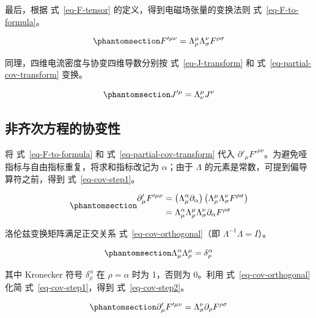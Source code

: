 \documentclass[
  chinese,
  a4paper,
  UTF8,
  12pt,
  oneside,
  openany]{ctexbook}
\theoremstyle{plain}
\theoremstyle{plain}
\theoremstyle{plain}
\theoremstyle{definition}
\theoremstyle{plain}
\theoremstyle{plain}
\theoremstyle{remark}
\begin{document}
最后，根据 式~\ref{eq-F-tensor} 的定义，得到电磁场张量的变换法则
式~\ref{eq-F-to-formula}。

\begin{equation}\protect\phantomsection\label{eq-F-to-formula}{
F'^{\mu\nu} = \Lambda_{\rho}^{\mu}\Lambda_{\sigma}^{\nu}F^{\rho\sigma}
}\end{equation}

同理，四维电流密度与协变四维导数分别按 式~\ref{eq-J-transform} 和
式~\ref{eq-partial-cov-transform} 变换。

\begin{equation}\protect\phantomsection\label{eq-J-transform}{
J'^{\mu} = \Lambda_{\nu}^{\mu}J^{\nu}
}\end{equation}

\subsection{非齐次方程的协变性}\label{ux975eux9f50ux6b21ux65b9ux7a0bux7684ux534fux53d8ux6027}

将 式~\ref{eq-F-to-formula} 和 式~\ref{eq-partial-cov-transform} 代入
\(\partial'_{\mu}F'^{\mu\nu}\)。为避免哑指标与自由指标重复，将求和指标改记为
\(\alpha\)；由于 \(\Lambda\) 的元素是常数，可提到偏导算符之前，得到
式~\ref{eq-cov-step1}。

\begin{equation}\protect\phantomsection\label{eq-cov-step1}{
\begin{aligned}
\partial'_{\mu}F'^{\mu\nu}
&= \left(\Lambda_{\mu}^{\alpha}\partial_{\alpha} \right)
\left(\Lambda_{\rho}^{\mu}\Lambda_{\sigma}^{\nu}F^{\rho\sigma} \right) \\
&= \Lambda_{\mu}^{\alpha}\Lambda_{\rho}^{\mu}\Lambda_{\sigma}^{\nu}\partial_{\alpha}F^{\rho\sigma}
\end{aligned}
}\end{equation}

洛伦兹变换矩阵满足正交关系 式~\ref{eq-cov-orthogonal}（即
\(\Lambda^{-1}\Lambda = I\)）。

\begin{equation}\protect\phantomsection\label{eq-cov-orthogonal}{
\Lambda_{\mu}^{\alpha}\Lambda_{\rho}^{\mu} = \delta_{\rho}^{\alpha}
}\end{equation}

其中 Kronecker 符号 \(\delta_{\rho}^{\alpha}\) 在 \(\rho = \alpha\) 时为
1，否则为 0。利用 式~\ref{eq-cov-orthogonal} 化简
式~\ref{eq-cov-step1}，得到 式~\ref{eq-cov-step2}。

\begin{equation}\protect\phantomsection\label{eq-cov-step2}{
\partial'_{\mu}F'^{\mu\nu} = \Lambda_{\sigma}^{\nu}\partial_{\rho}F^{\rho\sigma}
}\end{equation}
\end{document}
